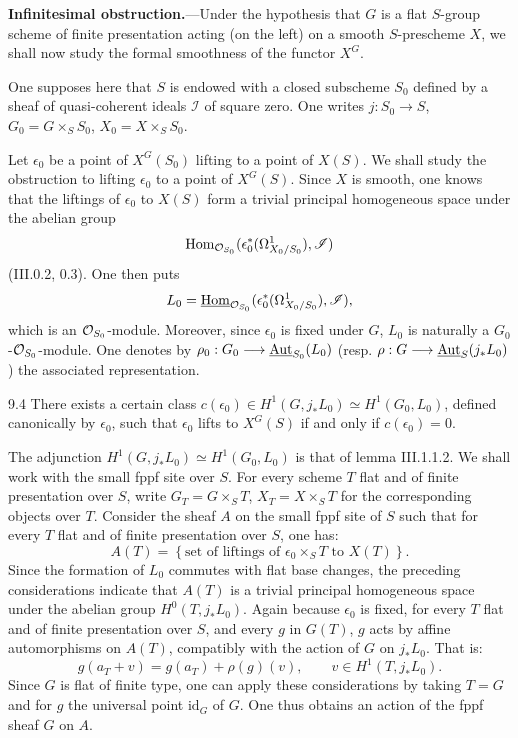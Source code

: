 \textbf{Infinitesimal obstruction.}---Under the hypothesis that $G$ is a flat $S$-group scheme of finite presentation acting (on the left) on a smooth $S$-prescheme $X$, we shall now study the formal smoothness of the functor $X^G$.

One supposes here that $S$ is endowed with a closed subscheme $S_0$ defined by a sheaf of quasi-coherent ideals $\mathscr I$ of square zero. One writes $j:S_0\to S$, $G_0=G\times_S S_0$, $X_0=X\times_S S_0$.

Let $\epsilon_0$ be a point of $X^G(S_0)$ lifting to a point of $X(S)$. We shall study the obstruction to lifting $\epsilon_0$ to a point of $X^G(S)$. Since $X$ is smooth, one knows that the liftings of $\epsilon_0$ to $X(S)$ form a trivial principal homogeneous space under the abelian group
\[
\operatorname{Hom}_{\mathcal{O}_{S_0}}(\epsilon_0^*(\Omega^1_{X_0/S_0}),\mathscr I)
\]
(III.0.2, 0.3). One then puts
\[
L_0=\underline{\operatorname{Hom}}_{\mathcal{O}_{S_0}}(\epsilon_0^*(\Omega^1_{X_0/S_0}),\mathscr I),
\]
which is an $\mathcal{O}_{S_0}$-module. Moreover, since $\epsilon_0$ is fixed under $G$, $L_0$ is naturally a $G_0$-$\mathcal{O}_{S_0}$-module. One denotes by $\rho_0:G_0\longrightarrow\underline{\operatorname{Aut}}_{S_0}(L_0)$ (resp. $\rho:G\longrightarrow\underline{\operatorname{Aut}}_S(j_*L_0)$) the associated representation.
\begin{lemma}{9.4}\label{XII.9.4}
There exists a certain class $c(\epsilon_0)\in H^1(G,j_*L_0)\simeq H^1(G_0,L_0)$, defined canonically by $\epsilon_0$, such that $\epsilon_0$ lifts to $X^G(S)$ if and only if $c(\epsilon_0)=0$.
\end{lemma}
The adjunction $H^1(G,j_*L_0)\simeq H^1(G_0,L_0)$ is that of lemma III.1.1.2. We shall work with the small fppf site over $S$. For every scheme $T$ flat and of finite presentation over $S$, write $G_T=G\times_S T$, $X_T=X\times_S T$ for the corresponding objects over $T$. Consider the sheaf $A$ on the small fppf site of $S$ such that for every $T$ flat and of finite presentation over $S$, one has:
\[
A(T)=\left\{\text{set of liftings of }\epsilon_0\times_S T\text{ to }X(T)\right\}.
\]
Since the formation of $L_0$ commutes with flat base changes, the preceding considerations indicate that $A(T)$ is a trivial principal homogeneous space under the abelian group $H^0(T,j_*L_0)$. Again because $\epsilon_0$ is fixed, for every $T$ flat and of finite presentation over $S$, and every $g$ in $G(T)$, $g$ acts by affine automorphisms on $A(T)$, compatibly with the action of $G$ on $j_*L_0$. That is:
\[
g(a_T+v)=g(a_T)+\rho(g)(v),\qquad v\in H^1(T,j_*L_0).
\]
Since $G$ is flat of finite type, one can apply these considerations by taking $T=G$ and for $g$ the universal point $\mathrm{id}_G$ of $G$. One thus obtains an action of the fppf sheaf $G$ on $A$.

